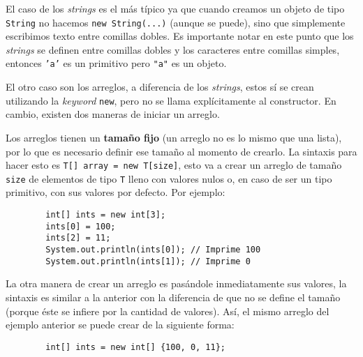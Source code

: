     El caso de los \textit{strings} es el más típico ya que cuando creamos un objeto de 
    tipo \texttt{String} no hacemos \texttt{new String(...)} (aunque 
    se puede), sino que simplemente escribimos texto entre comillas dobles.
    Es importante notar en este punto que los \textit{strings} se definen entre comillas
    dobles y los caracteres entre comillas simples, entonces \texttt{'a'} es un
    primitivo pero \texttt{"a"} es un objeto.
    
    El otro caso son los arreglos, a diferencia de los \textit{strings}, estos sí se crean
    utilizando la \textit{keyword} \texttt{new}, pero no se llama explícitamente al 
    constructor.
    En cambio, existen dos maneras de iniciar un arreglo.

    Los arreglos tienen un \textbf{tamaño fijo} (un arreglo no es lo mismo que una lista), 
    por lo que es necesario definir ese tamaño al momento de crearlo.
    La sintaxis para hacer esto es \texttt{T[] array = new T[size]}, esto va a 
    crear un arreglo de tamaño \texttt{size} de elementos de tipo \texttt{T} lleno con 
    valores nulos o, en caso de ser un tipo primitivo, con sus valores por defecto.
    Por ejemplo:

    \begin{listing}[ht!]
      \begin{verbatim}
        int[] ints = new int[3];
        ints[0] = 100;
        ints[2] = 11;
        System.out.println(ints[0]); // Imprime 100
        System.out.println(ints[1]); // Imprime 0
      \end{verbatim}
    \end{listing}

    La otra manera de crear un arreglo es pasándole inmediatamente sus valores, la 
    sintaxis es similar a la anterior con la diferencia de que no se define el tamaño 
    (porque éste se infiere por la cantidad de valores).
    Así, el mismo arreglo del ejemplo anterior se puede crear de la siguiente forma:

    \begin{listing}[ht!]
      \begin{verbatim}
        int[] ints = new int[] {100, 0, 11};
      \end{verbatim}
    \end{listing}


